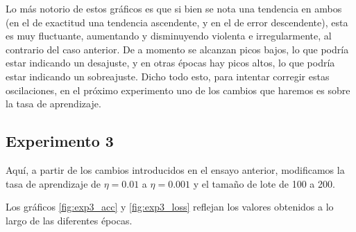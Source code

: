 \documentclass[aps,twocolumn,groupedaddress]{revtex4-2}
\begin{document}
Lo más notorio de estos gráficos es que si bien se nota una tendencia en ambos (en el de exactitud una tendencia ascendente, y en el de error descendente), esta es muy fluctuante, aumentando y disminuyendo violenta e irregularmente, al contrario del caso anterior. De a momento se alcanzan picos bajos, lo que podría estar indicando un desajuste, y en otras épocas hay picos altos, lo que podría estar indicando un sobreajuste. Dicho todo esto, para intentar corregir estas oscilaciones, en el próximo experimento uno de los cambios que haremos es sobre la tasa de aprendizaje.

\subsection{Experimento 3}
Aquí, a partir de los cambios introducidos en el ensayo anterior, modificamos la tasa de aprendizaje de \(\eta=0.01\) a \(\eta=0.001\) y el tamaño de lote de 100 a 200.

Los gráficos \ref{fig:exp3_acc} y \ref{fig:exp3_loss} reflejan los valores obtenidos a lo largo de las diferentes épocas. 
\end{document}
